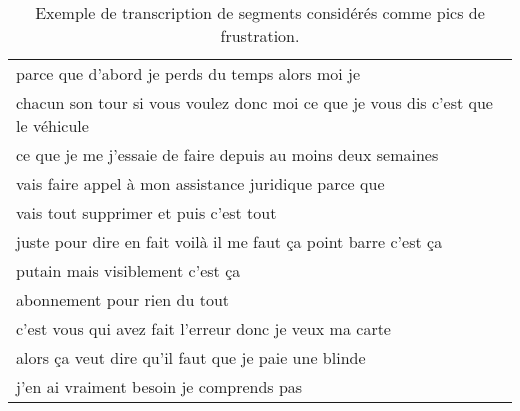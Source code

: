 \begin{table}[h]
    \centering
    \begin{tabular}{|l|}
         \hline
         parce que d'abord je perds du temps alors moi je \\
         chacun son tour si vous voulez donc moi ce que je vous dis c'est que le véhicule \\
        ce que je me j'essaie de faire depuis au moins deux semaines \\
        vais faire appel à mon assistance juridique parce que \\
        vais tout supprimer et puis c'est tout \\
        juste pour dire en fait voilà il me faut ça point barre c'est ça \\
        putain mais visiblement c'est ça \\
        abonnement pour rien du tout \\
        c'est vous qui avez fait l'erreur donc je veux ma carte \\
        alors ça veut dire qu'il faut que je paie une blinde \\
        j'en ai vraiment besoin je comprends pas \\
         \hline
    \end{tabular}
    \caption{Exemple de transcription de segments considérés comme pics de frustration.}
    \label{tab:phrasesPic}
\end{table}
